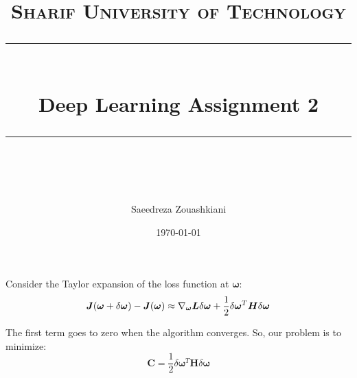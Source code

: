 \documentclass[11pt]{scrartcl} %
\title{	
	\normalfont\normalsize
	\textsc{Sharif University of Technology}\\ %
	\vspace{25pt} %
	\rule{\linewidth}{0.5pt}\\ %
	\vspace{20pt} %
	{\huge Deep Learning Assignment 2}\\ %
	\vspace{12pt} %
	\rule{\linewidth}{2pt}\\ %
	\vspace{12pt} %
}
\author{\LARGE Saeedreza Zouashkiani} %
\date{\normalsize\today} %
\begin{document}
\maketitle %

\section{} %


	\subsection{}
		Consider the Taylor expansion of the loss function at $\boldsymbol\omega$:
		\begin{equation} 
			\boldsymbol{J}(\boldsymbol{\omega}+ \delta\boldsymbol\omega) - \\
			\boldsymbol{J}(\boldsymbol{\omega}) \approx \\
			\nabla_{\boldsymbol\omega}\boldsymbol{L}\delta\boldsymbol{\omega} + \\
			\frac{1}{2}\delta\boldsymbol{\omega}^T\boldsymbol{H}\delta\boldsymbol{\omega} 
		\end{equation}

		The first term goes to zero when the algorithm converges. So, our problem is to minimize:
		\begin{equation}\label{eq:1}
			\boldsymbol{C} = \frac{1}{2}\delta\boldsymbol{\omega}^T\boldsymbol{H}\delta\boldsymbol{\omega}
		\end{equation}
\end{document}
